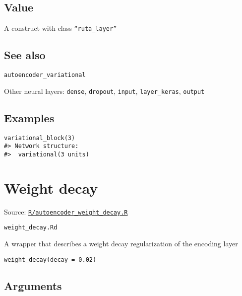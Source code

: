 \hypertarget{value}{\subsection{\texorpdfstring{\protect\hyperlink{value}{}Value}{Value}}\label{value}}

A construct with class \texttt{``ruta\_layer''}

\hypertarget{see-also}{\subsection{\texorpdfstring{\protect\hyperlink{see-also}{}See
also}{See also}}\label{see-also}}

\texttt{autoencoder\_variational}

Other neural layers: \texttt{dense}, \texttt{dropout}, \texttt{input},
\texttt{layer\_keras}, \texttt{output}

\hypertarget{examples}{\subsection{\texorpdfstring{\protect\hyperlink{examples}{}Examples}{Examples}}\label{examples}}

\begin{verbatim}
variational_block(3)
#> Network structure:
#>  variational(3 units)
\end{verbatim}

\section{Weight decay}\label{weight-decay}

Source:
\href{https://github.com/fdavidcl/ruta/blob/master/R/autoencoder_weight_decay.R}{\texttt{R/autoencoder\_weight\_decay.R}}

\texttt{weight\_decay.Rd}

A wrapper that describes a weight decay regularization of the encoding
layer

\begin{verbatim}
weight_decay(decay = 0.02)
\end{verbatim}

\hypertarget{arguments}{\subsection{\texorpdfstring{\protect\hyperlink{arguments}{}Arguments}{Arguments}}\label{arguments}}

